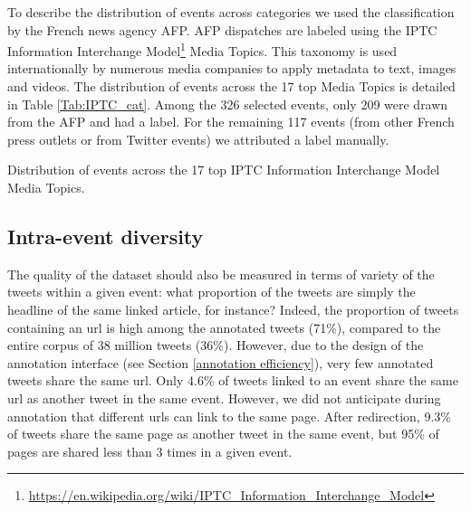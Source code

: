 %
%

To describe the distribution of events across categories we used the classification by the French news agency AFP. AFP dispatches are labeled using the IPTC Information Interchange Model\footnote{\url{https://en.wikipedia.org/wiki/IPTC_Information_Interchange_Model}} Media Topics. This taxonomy is used internationally by numerous media companies to apply metadata to text, images and videos. The distribution of events across the 17 top Media Topics is detailed in Table \ref{Tab:IPTC_cat}. Among the 326 selected events, only 209 were drawn from the AFP and had a label. For the remaining 117 events (from other French press outlets or from Twitter events) we attributed a label manually.

\begin{table}
\begin{center}
\makebox[\textwidth][c]{}
\end{center}
\caption{Distribution of events across the 17 top IPTC Information Interchange Model Media Topics. \label{Tab:IPTC_cat}}
\end{table}

\subsection{Intra-event diversity}
The quality of the dataset should also be measured in
terms of variety of the tweets within a given event: what
proportion of the tweets are simply the headline of the
same linked article, for instance? Indeed, the proportion of
tweets containing an url is high among the annotated
tweets (71\%), compared to the entire corpus of 38 million
tweets (36\%). However, due to the design of the
annotation interface (see Section \ref{annotation efficiency}), very few
annotated tweets share the same url. Only 4.6\% of tweets
linked to an event share the same url as another tweet in
the same event.
However, we did not anticipate during annotation that
different urls can link to the same page. After redirection,
9.3\% of tweets share the same page as another tweet in
the same event, but 95\% of pages are shared less than 3
times in a given event.

